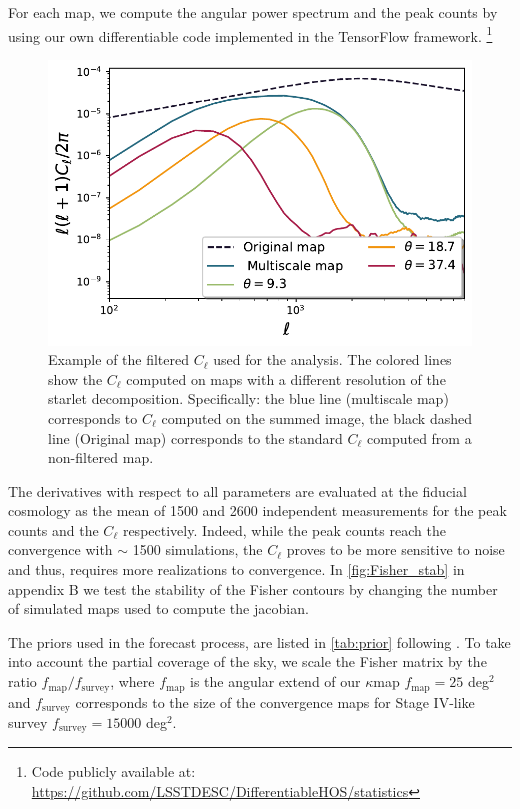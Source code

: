 \documentclass{aa}
\begin{document}
For each map, we compute the angular power spectrum and the peak counts by using our own differentiable code implemented in the TensorFlow framework. \footnote{
Code publicly available at: \\ \href{https://github.com/LSSTDESC/DifferentiableHOS/tree/main/DifferentiableHOS/statistics}{https://github.com/LSSTDESC/DifferentiableHOS/statistics}  }
\begin{figure}\label{window}
    \centering
    \includegraphics[width=0.95\columnwidth]{paper/figures/window.pdf}
    \caption{Example of the filtered $C_{\ell}$ used for the analysis. The colored lines show the $C_{\ell}$ computed on maps with a different resolution of the starlet decomposition. Specifically: the blue line (multiscale map) corresponds to $C_{\ell}$ computed on the summed image, the black dashed line (Original map) corresponds to the standard $C_{\ell}$ computed from a non-filtered map. }
     \label{fig:window}
\end{figure}



The derivatives with respect to all parameters are evaluated at the fiducial cosmology as the mean of 1500 and 2600 independent measurements for the peak counts and the $C_{\ell}$ respectively. Indeed, while the peak counts reach the convergence with $\sim$ 1500 simulations, the $C_{\ell}$ proves to be more sensitive to noise and thus, requires more realizations to convergence.
In \autoref{fig:Fisher_stab} in appendix B we test the stability of the Fisher contours by changing the number of simulated maps used to compute the jacobian.


The priors used in the forecast process, are listed in \autoref{tab:prior} following \citet{zhang2022transitioning}.
To take into account the partial coverage of the sky, we scale the Fisher matrix by the ratio $f_{\text{map}}/f_{\text{survey}}$, where $f_{\text{map}}$ is the angular extend of our $\kappa$map $f_{\text{map}}=25$ deg$^2$ and $f_{\text{survey}}$ corresponds to the size of the convergence maps for Stage IV-like survey $f_{\text{survey}}=15000$ deg$^2$.
\end{document}
